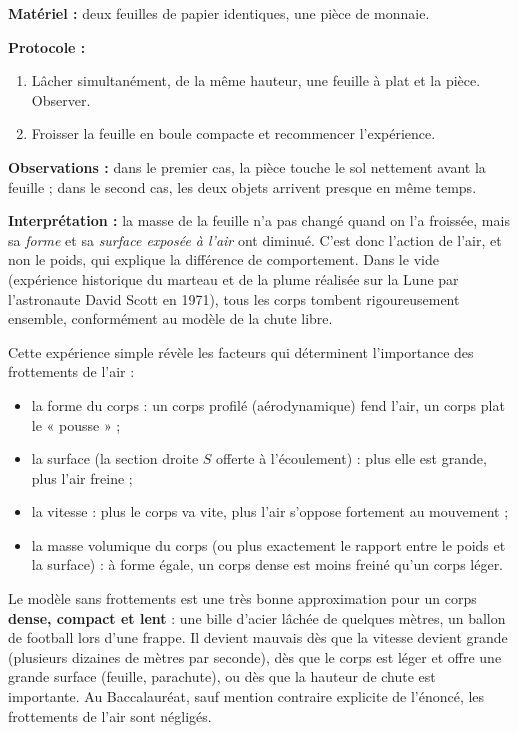 \documentclass[11pt]{article}
\newcommand{\cle}[1]{{\popxbold\color{popdark}#1}}
\newcounter{popsec}
\newcounter{popsub}
\newcommand{\courssub}[1]{%
  \stepcounter{popsub}%
  \par\vspace{9pt}\noindent{\popxbold\fontsize{11.5}{13}\selectfont\color{popink}{\color{poporange}\thepopsec.\thepopsub}\hspace{6pt}#1}\par\nopagebreak\vspace{4pt}
}
\begin{document}
\courssub{Limites du modèle de la chute libre}

\begin{experience}
\textbf{Matériel :} deux feuilles de papier identiques, une pièce de monnaie.

\textbf{Protocole :}
\begin{enumerate}
\item Lâcher simultanément, de la même hauteur, une feuille à plat et la pièce. Observer.
\item Froisser la feuille en boule compacte et recommencer l'expérience.
\end{enumerate}

\textbf{Observations :} dans le premier cas, la pièce touche le sol nettement avant la feuille ; dans le second cas, les deux objets arrivent presque en même temps.

\textbf{Interprétation :} la masse de la feuille n'a pas changé quand on l'a froissée, mais sa \emph{forme} et sa \emph{surface exposée à l'air} ont diminué. C'est donc l'action de l'air, et non le poids, qui explique la différence de comportement. Dans le vide (expérience historique du marteau et de la plume réalisée sur la Lune par l'astronaute David Scott en 1971), tous les corps tombent rigoureusement ensemble, conformément au modèle de la chute libre.
\end{experience}

Cette expérience simple révèle les facteurs qui déterminent l'importance des frottements de l'air :

\begin{itemize}
\item la \cle{forme} du corps : un corps profilé (aérodynamique) fend l'air, un corps plat le « pousse » ;
\item la \cle{surface} (la section droite $S$ offerte à l'écoulement) : plus elle est grande, plus l'air freine ;
\item la \cle{vitesse} : plus le corps va vite, plus l'air s'oppose fortement au mouvement ;
\item la \cle{masse volumique} du corps (ou plus exactement le rapport entre le poids et la surface) : à forme égale, un corps dense est moins freiné qu'un corps léger.
\end{itemize}

\begin{attention}
Le modèle sans frottements est une très bonne approximation pour un corps \textbf{dense, compact et lent} : une bille d'acier lâchée de quelques mètres, un ballon de football lors d'une frappe. Il devient mauvais dès que la vitesse devient grande (plusieurs dizaines de mètres par seconde), dès que le corps est léger et offre une grande surface (feuille, parachute), ou dès que la hauteur de chute est importante. Au Baccalauréat, sauf mention contraire explicite de l'énoncé, les frottements de l'air sont négligés.
\end{attention}
\end{document}

